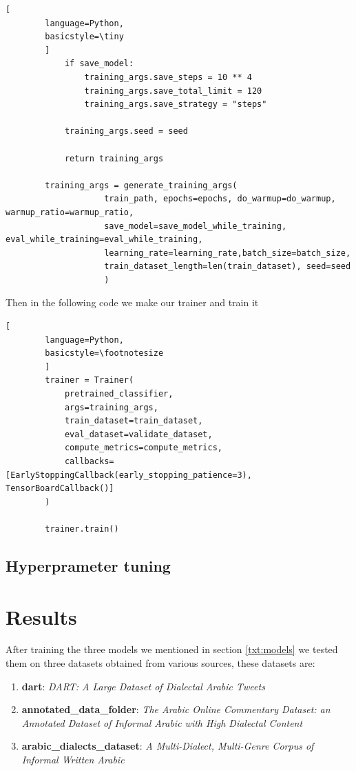 \documentclass[12pt]{diazessay}
\begin{document}
\begin{lstlisting}[
        language=Python,
        basicstyle=\tiny
        ]
            if save_model:
                training_args.save_steps = 10 ** 4
                training_args.save_total_limit = 120
                training_args.save_strategy = "steps"
        
            training_args.seed = seed
        
            return training_args
            
        training_args = generate_training_args(
                    train_path, epochs=epochs, do_warmup=do_warmup, warmup_ratio=warmup_ratio, 
                    save_model=save_model_while_training, eval_while_training=eval_while_training, 
                    learning_rate=learning_rate,batch_size=batch_size, 
                    train_dataset_length=len(train_dataset), seed=seed
                    )
    \end{lstlisting}
    
    Then in the following code we make our trainer and train it
    \begin{lstlisting}[
        language=Python,
        basicstyle=\footnotesize
        ]
        trainer = Trainer(
            pretrained_classifier,
            args=training_args,
            train_dataset=train_dataset,
            eval_dataset=validate_dataset,
            compute_metrics=compute_metrics,
            callbacks=[EarlyStoppingCallback(early_stopping_patience=3), TensorBoardCallback()]
        )
        
        trainer.train()
    \end{lstlisting}
    
    \subsection{Hyperprameter tuning}
    
    
    \section {Results}
    After training the three models we mentioned in section \ref{txt:models} we tested them on three datasets obtained from various sources, these datasets are: \label{txt:res}
    \begin{enumerate}
        \item \textbf{dart}: \emph{DART: A Large Dataset of Dialectal Arabic Tweets}\cite{alsarsour-etal-2018-dart}
        \item \textbf{annotated\_data\_folder}: \emph{The Arabic Online Commentary Dataset:
an Annotated Dataset of Informal Arabic with High Dialectal Content}\cite{zaidan_burch}
        \item \textbf{arabic\_dialects\_dataset}: \emph{A Multi-Dialect, Multi-Genre Corpus of Informal Written Arabic}\cite{cotterell-callison-burch-2014-multi}
    \end{enumerate}
    
\end{document}
